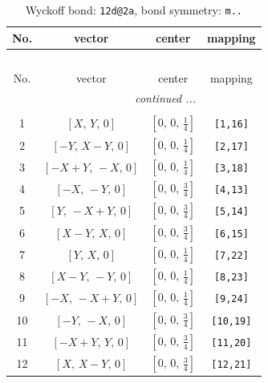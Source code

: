 \documentclass[fleqn,8pt]{jsarticle}
\begin{document}
\begin{longtable}{cccc}
\caption{Wyckoff bond: {\tt 12d@2a}, bond symmetry: {\tt m..}}
 \\
 \hline \hline
No. & vector & center & mapping \\ \hline \endfirsthead

\multicolumn{3}{l}{\tablename\ \thetable{}} \\
 \hline \hline
No. & vector & center & mapping \\ \hline \endhead

 \hline \hline
\multicolumn{3}{r}{\footnotesize\it continued ...} \\ \endfoot

 \hline \hline
\multicolumn{3}{r}{} \\ \endlastfoot

1 & $\left[ X,\, Y,\, 0 \right]$ & $\left[ 0,\, 0,\, \frac{1}{4} \right]$ & {\tt [1,16]} \\ \hline
2 & $\left[ - Y,\, X - Y,\, 0 \right]$ & $\left[ 0,\, 0,\, \frac{1}{4} \right]$ & {\tt [2,17]} \\ \hline
3 & $\left[ - X + Y,\, - X,\, 0 \right]$ & $\left[ 0,\, 0,\, \frac{1}{4} \right]$ & {\tt [3,18]} \\ \hline
4 & $\left[ - X,\, - Y,\, 0 \right]$ & $\left[ 0,\, 0,\, \frac{3}{4} \right]$ & {\tt [4,13]} \\ \hline
5 & $\left[ Y,\, - X + Y,\, 0 \right]$ & $\left[ 0,\, 0,\, \frac{3}{4} \right]$ & {\tt [5,14]} \\ \hline
6 & $\left[ X - Y,\, X,\, 0 \right]$ & $\left[ 0,\, 0,\, \frac{3}{4} \right]$ & {\tt [6,15]} \\ \hline
7 & $\left[ Y,\, X,\, 0 \right]$ & $\left[ 0,\, 0,\, \frac{1}{4} \right]$ & {\tt [7,22]} \\ \hline
8 & $\left[ X - Y,\, - Y,\, 0 \right]$ & $\left[ 0,\, 0,\, \frac{1}{4} \right]$ & {\tt [8,23]} \\ \hline
9 & $\left[ - X,\, - X + Y,\, 0 \right]$ & $\left[ 0,\, 0,\, \frac{1}{4} \right]$ & {\tt [9,24]} \\ \hline
10 & $\left[ - Y,\, - X,\, 0 \right]$ & $\left[ 0,\, 0,\, \frac{3}{4} \right]$ & {\tt [10,19]} \\ \hline
11 & $\left[ - X + Y,\, Y,\, 0 \right]$ & $\left[ 0,\, 0,\, \frac{3}{4} \right]$ & {\tt [11,20]} \\ \hline
12 & $\left[ X,\, X - Y,\, 0 \right]$ & $\left[ 0,\, 0,\, \frac{3}{4} \right]$ & {\tt [12,21]} \\
\end{longtable}
\end{document}
